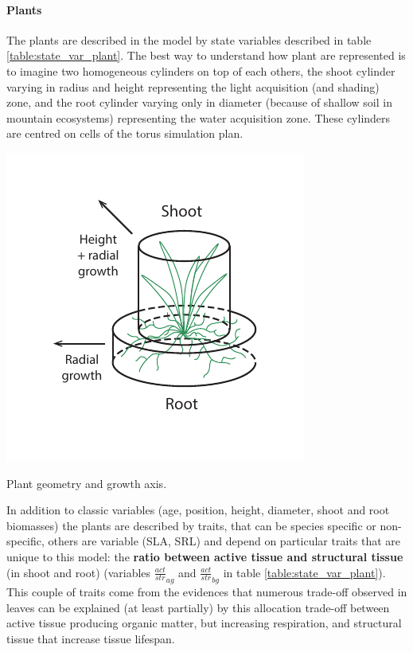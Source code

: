 \paragraph{Plants} The plants are described in the model by state variables described in table \ref{table:state_var_plant}. The best way to understand how plant are represented is to imagine two homogeneous cylinders on top of each others, the shoot cylinder varying in radius and height representing the light acquisition (and shading) zone, and the root cylinder varying only in diameter (because of shallow soil in mountain ecosystems) representing the water acquisition zone. These cylinders are centred on cells of the torus simulation plan.\\
\begin{marginfigure}
\includegraphics{./Figures/plant_geometry_m.pdf}
\caption{Plant geometry and growth axis.}
\end{marginfigure}
\indent In addition to classic variables (age, position, height, diameter, shoot and root biomasses) the plants are described by traits, that can be species specific or non-specific, others are variable (SLA, SRL) and depend on particular traits that are unique to this model: the \textbf{ratio between active tissue and structural tissue} (in shoot and root) (variables $\frac{act}{str}_{ag}$ and $\frac{act}{str}_{bg}$ in table \ref{table:state_var_plant}). This couple of traits come from the evidences that numerous trade-off observed in leaves can be explained (at least partially) by this allocation trade-off between active tissue producing organic matter, but increasing respiration, and structural tissue that increase tissue lifespan.

